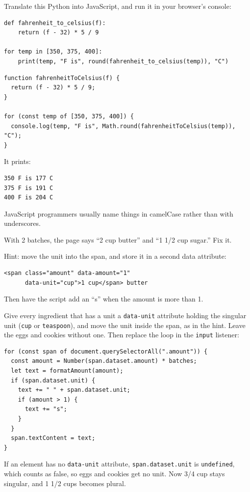 \begin{Exercise}[title={Python to JavaScript}, label=cj_translate]
Translate this Python into JavaScript, and run it in your browser's console:
\begin{verbatim}
def fahrenheit_to_celsius(f):
    return (f - 32) * 5 / 9

for temp in [350, 375, 400]:
    print(temp, "F is", round(fahrenheit_to_celsius(temp)), "C")
\end{verbatim}
\end{Exercise}
\begin{Answer}[ref=cj_translate]
\begin{verbatim}
function fahrenheitToCelsius(f) {
  return (f - 32) * 5 / 9;
}

for (const temp of [350, 375, 400]) {
  console.log(temp, "F is", Math.round(fahrenheitToCelsius(temp)), "C");
}
\end{verbatim}
It prints:
\begin{verbatim}
350 F is 177 C
375 F is 191 C
400 F is 204 C
\end{verbatim}
JavaScript programmers usually name things in camelCase rather than with underscores.
\end{Answer}

\begin{Exercise}[title={2 Cup Butter?}, label=cj_plural]
With 2 batches, the page says ``2 cup butter'' and ``1 1/2 cup sugar.'' Fix it.

Hint: move the unit into the span, and store it in a second data attribute:
\begin{verbatim}
<span class="amount" data-amount="1"
      data-unit="cup">1 cup</span> butter
\end{verbatim}
Then have the script add an ``s'' when the amount is more than 1.
\end{Exercise}
\begin{Answer}[ref=cj_plural]
Give every ingredient that has a unit a \verb|data-unit| attribute holding the singular unit
(\verb|cup| or \verb|teaspoon|), and move the unit inside the span, as in the hint. Leave the eggs and cookies without one.
Then replace the loop in the \verb|input| listener:
\begin{verbatim}
for (const span of document.querySelectorAll(".amount")) {
  const amount = Number(span.dataset.amount) * batches;
  let text = formatAmount(amount);
  if (span.dataset.unit) {
    text += " " + span.dataset.unit;
    if (amount > 1) {
      text += "s";
    }
  }
  span.textContent = text;
}
\end{verbatim}
If an element has no \verb|data-unit| attribute, \verb|span.dataset.unit| is \verb|undefined|, which
counts as false, so eggs and cookies get no unit. Now 3/4 cup stays singular, and 1 1/2 cups becomes
plural.
\end{Answer}

